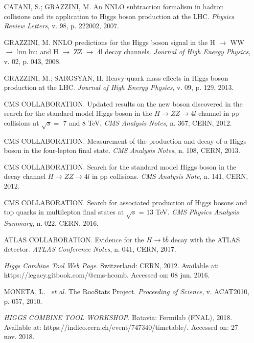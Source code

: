 \begin{thebibliography}{}
CATANI, S.; GRAZZINI, M. An NNLO subtraction formalism in hadron collisions and its application to Higgs boson production at the LHC. \textit{Physics Review Letters}, v. 98, p. 222002, 2007.

GRAZZINI, M. NNLO predictions for the Higgs boson signal in the H $\rightarrow$ WW $\rightarrow$ lnu lnu and H $\rightarrow$ ZZ $\rightarrow$ 4l decay channels. \textit{Journal of High Energy Physics}, v. 02, p. 043, 2008.

GRAZZINI, M.; SARGSYAN, H. Heavy-quark mass effects in Higgs boson production at the LHC. \textit{Journal of High Energy Physics}, v. 09, p. 129, 2013.

CMS COLLABORATION. Updated results on the new boson discovered in the search for the standard model Higgs boson in the $H \rightarrow ZZ \rightarrow 4l$ channel in pp collisions at $\sqrt{s}=$ 7 and 8 TeV. \textit{CMS Analysis Notes}, n. 367, CERN, 2012.

CMS COLLABORATION. Measurement of the production and decay of a Higgs boson in the four-lepton final state. \textit{CMS Analysis Notes}, n. 108, CERN, 2013.

CMS COLLABORATION. Search for the standard model Higgs boson in the decay channel $H \rightarrow ZZ \rightarrow 4l$ in pp collisions. \textit{CMS Analysis Note}, n. 141, CERN, 2012.

CMS COLLABORATION. Search for associated production of Higgs bosons and top quarks in multilepton final states at $\sqrt{s}$ = 13 TeV. \textit{CMS Physics Analysis Summary}, n. 022, CERN, 2016.

ATLAS COLLABORATION. Evidence for the $H \rightarrow b\bar{b}$ decay with the ATLAS detector. \textit{ATLAS Conference Notes}, n. 041, CERN, 2017.

\textit{Higgs Combine Tool Web Page}. Switzerland: CERN, 2012. Available at: https://legacy.gitbook.com/@cms-hcomb. Accessed on: 08 jun. 2016.

MONETA, L. ~\textit{et al.} The RooStats Project. \textit{Proceeding of Science}, v. ACAT2010, p. 057, 2010.

\textit{HIGGS COMBINE TOOL WORKSHOP}. Batavia: Fermilab (FNAL), 2018. Available at: https://indico.cern.ch/event/747340/timetable/. Accessed on: 27 nov. 2018.


\end{thebibliography}

